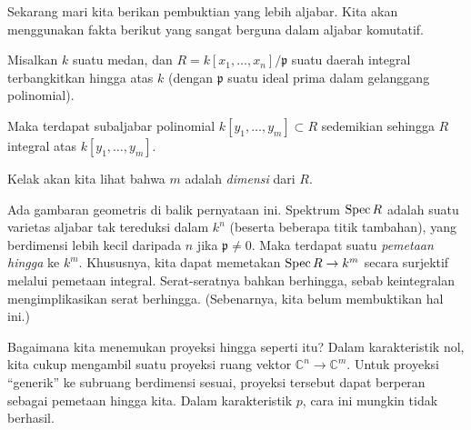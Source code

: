 Sekarang mari kita berikan pembuktian yang lebih aljabar.
Kita akan menggunakan fakta berikut yang sangat berguna dalam aljabar komutatif.

\begin{theorem} Misalkan $k$ suatu medan, dan $R =
k[x_1, \dots, x_n]/\mathfrak{p}$ suatu daerah integral terbangkitkan hingga atas $k$ (dengan
$\mathfrak{p}$ suatu ideal prima dalam gelanggang polinomial).

Maka terdapat subaljabar polinomial $k[y_1, \dots, y_m] \subset R$ sedemikian
sehingga $R$ integral atas $k[y_1, \dots, y_m]$.
\end{theorem}

Kelak akan kita lihat bahwa $m$ adalah \emph{dimensi} dari $R$.

Ada gambaran geometris di balik pernyataan ini. Spektrum $\operatorname{Spec} R$ adalah suatu varietas aljabar tak tereduksi
dalam $k^n$ (beserta beberapa titik tambahan), yang berdimensi lebih kecil daripada
$n$ jika $\mathfrak{p} \neq 0$. Maka terdapat suatu \emph{pemetaan hingga} ke $k^m$.
Khususnya, kita dapat memetakan $\operatorname{Spec} R \to k^m$ secara surjektif melalui pemetaan integral.
Serat-seratnya bahkan berhingga, sebab keintegralan mengimplikasikan serat berhingga. (Sebenarnya,
kita belum membuktikan hal ini.)

Bagaimana kita menemukan proyeksi hingga seperti itu? Dalam karakteristik
nol, kita cukup mengambil suatu
proyeksi ruang vektor $\mathbb{C}^n \to \mathbb{C}^m$. Untuk proyeksi ``generik''
ke subruang berdimensi sesuai, proyeksi tersebut dapat berperan
sebagai pemetaan hingga kita. Dalam karakteristik $p$, cara ini mungkin tidak berhasil.

